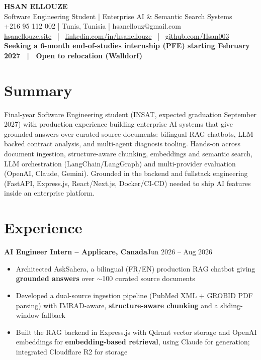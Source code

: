 \documentclass[10pt,a4paper]{article}
\newcommand{\entry}[2]{\vspace{1pt}\noindent\textbf{#1}\hfill{\color{muted}#2}\par}
\begin{document}
\begin{center}
  {\LARGE\bfseries HSAN ELLOUZE}\\[2pt]
  {\color{muted} Software Engineering Student | Enterprise AI \& Semantic Search Systems}\\[2pt]
  {\footnotesize +216 95 112 002 | Tunis, Tunisia | hsanellouz@gmail.com}\\[1pt]
  {\footnotesize \href{https://hsanellouze.site}{hsanellouze.site} \ | \ \href{https://linkedin.com/in/hsanellouze}{linkedin.com/in/hsanellouze} \ | \ \href{https://github.com/Hsan003}{github.com/Hsan003}}\\[3pt]
  {\footnotesize\bfseries Seeking a 6-month end-of-studies internship (PFE) starting February 2027 \ | \ Open to relocation (Walldorf)}
\end{center}

\section{Summary}
Final-year Software Engineering student (INSAT, expected graduation September 2027) with production experience building enterprise AI systems that give grounded answers over curated source documents: bilingual RAG chatbots, LLM-backed contract analysis, and multi-agent diagnosis tooling. Hands-on across document ingestion, structure-aware chunking, embeddings and semantic search, LLM orchestration (LangChain/LangGraph) and multi-provider evaluation (OpenAI, Claude, Gemini). Grounded in the backend and fullstack engineering (FastAPI, Express.js, React/Next.js, Docker/CI-CD) needed to ship AI features inside an enterprise platform.

\section{Experience}
\entry{AI Engineer Intern -- Applicare, Canada}{Jun 2026 -- Aug 2026}
\begin{itemize}
  \item Architected AskSahera, a bilingual (FR/EN) production RAG chatbot giving \textbf{grounded answers} over $\sim$100 curated source documents
  \item Developed a dual-source ingestion pipeline (PubMed XML + GROBID PDF parsing) with IMRAD-aware, \textbf{structure-aware chunking} and a sliding-window fallback
  \item Built the RAG backend in Express.js with Qdrant vector storage and OpenAI embeddings for \textbf{embedding-based retrieval}, using Claude for generation; integrated Cloudflare R2 for storage
\end{itemize}
\end{document}
